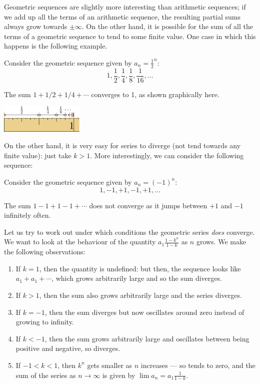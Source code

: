 Geometric sequences are slightly more interesting than arithmetic sequences; if we add up all the terms of an arithmetic sequence, the
resulting partial sums always grow towards $ \pm\infty $. On the other hand, it is possible for the sum of all the terms of a
geometric sequence to tend to some finite value. One case in which this happens is the following example.
\begin{ex}
  Consider the geometric sequence given by $ a_n = \frac{1}{2}^n $:
  \begin{displaymath}
    1, \frac{1}{2}, \frac{1}{4}, \frac{1}{8}, \frac{1}{16}, \dots
  \end{displaymath}

  The sum $ 1 + 1/2 + 1/4 + \cdots $ converges to 1, as shown graphically here.
  \begin{center}
    \includegraphics[width=0.3\textwidth]{geomconverge}
  \end{center}
\end{ex}
On the other hand, it is very easy for series to diverge (not tend towards any finite value): just take $ k > 1 $. More interestingly,
we can consider the following sequence:
\begin{ex}
  Consider the geometric sequence given by $ a_n = (-1)^n $:
  \begin{displaymath}
    1, -1, +1, -1, +1, \dots
  \end{displaymath}

  The sum $ 1 - 1 + 1 - 1 + \cdots $ does not converge as it jumps between $ +1 $ and $ -1 $ infinitely often.
\end{ex}

Let us try to work out under which conditions the geometric series \emph{does} converge. We want to look at
the behaviour of the quantity $ a_1 \frac{1 - k^n}{1 - k} $ as $ n $ grows. We make the following observations:
\begin{enumerate}
  \item If $ k = 1 $, then the quantity is undefined: but then, the sequence looks like $ a_1 + a_1 + \cdots $, which
        grows arbitrarily large and so the sum diverges.
  \item If $ k > 1 $, then the sum also grows arbitrarily large and the series diverges.
  \item If $ k = -1 $, then the sum diverges but now oscillates around zero instead of growing to infinity.
  \item If $ k < -1 $, then the sum grows arbitrarily large and oscillates between being positive and negative, so diverges.
  \item If $ -1 < k < 1 $, then $ k^n $ gets smaller as $ n $ increases --- so tends to zero, and the sum of the series
        as $ n \to \infty $ is given by $ \lim a_n = a_1 \frac{1}{1 - k} $.
\end{enumerate}

